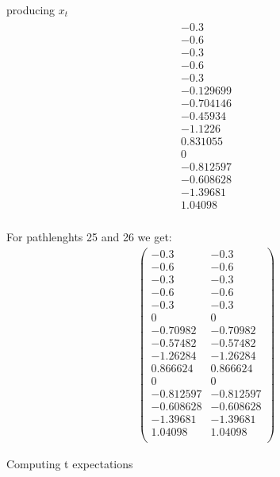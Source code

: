 producing $x_t$
\begin{gather*}\begin{array}{c}
 -0.3 \\
 -0.6 \\
 -0.3 \\
 -0.6 \\
 -0.3 \\
 -0.129699 \\
 -0.704146 \\
 -0.45934 \\
 -1.1226 \\
 0.831055 \\
 0 \\
 -0.812597 \\
 -0.608628 \\
 -1.39681 \\
 1.04098 \\
\end{array}
\end{gather*}



For pathlenghts 25 and 26 we get:
{\small
\begin{gather*}\left(
\begin{array}{cc}
 -0.3 & -0.3 \\
 -0.6 & -0.6 \\
 -0.3 & -0.3 \\
 -0.6 & -0.6 \\
 -0.3 & -0.3 \\
 0 & 0 \\
 -0.70982 & -0.70982 \\
 -0.57482 & -0.57482 \\
 -1.26284 & -1.26284 \\
 0.866624 & 0.866624 \\
 0 & 0 \\
 -0.812597 & -0.812597 \\
 -0.608628 & -0.608628 \\
 -1.39681 & -1.39681 \\
 1.04098 & 1.04098 \\
\end{array}
\right)
\end{gather*}
}




Computing t expectations 


